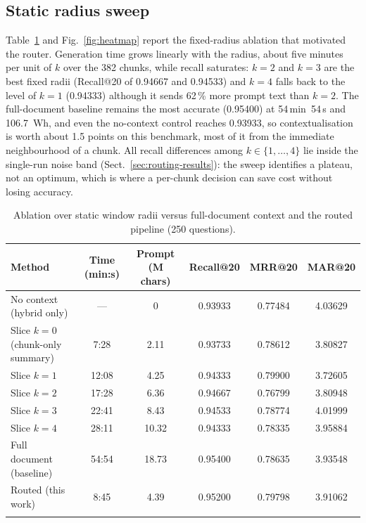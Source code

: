 \documentclass[pdflatex,sn-mathphys-num]{sn-jnl}
\makeatletter
\newcommand{\Rec}[1]{Recall@#1}
\newcommand{\MRR}[1]{MRR@#1}
\newcommand{\MAR}[1]{MAR@#1}
\theoremstyle{thmstyleone}%
\theoremstyle{thmstylethree}%
\makeatother
\begin{document}
\subsection{Static radius sweep}\label{sec:static}

Table~\ref{tab:sweep} and Fig.~\ref{fig:heatmap} report the fixed-radius ablation that motivated the router. Generation time grows linearly with the radius, about five minutes per unit of $k$ over the 382 chunks, while recall saturates: $k=2$ and $k=3$ are the best fixed radii (\Rec{20} of 0.94667 and 0.94533) and $k=4$ falls back to the level of $k=1$ (0.94333) although it sends 62\,\% more prompt text than $k=2$. The full-document baseline remains the most accurate (0.95400) at 54\,min~54\,s and 106.7\, Wh, and even the no-context control reaches 0.93933, so contextualisation is worth about 1.5 points on this benchmark, most of it from the immediate neighbourhood of a chunk. All recall differences among $k\in\{1,\dots,4\}$ lie inside the single-run noise band (Sect.~\ref{sec:routing-results}): the sweep identifies a plateau, not an optimum, which is where a per-chunk decision can save cost without losing accuracy.

\begin{table}[htbp]
\caption{Ablation over static window radii versus full-document context and the routed pipeline (250 questions).}\label{tab:sweep}
\setlength{\tabcolsep}{4pt}
\begin{tabular}{@{}p{3.7cm}ccccc@{}}
\toprule
Method & Time (min:s) & Prompt (M chars) & \Rec{20} & \MRR{20} & \MAR{20} \\
\midrule
No context (hybrid only) & --- & 0 & 0.93933 & 0.77484 & 4.03629 \\
Slice $k=0$ (chunk-only summary) & 7:28\footnotemark[1] & 2.11 & 0.93733 & 0.78612 & 3.80827 \\
Slice $k=1$ & 12:08\footnotemark[1] & 4.25 & 0.94333 & 0.79900 & 3.72605 \\
Slice $k=2$ & 17:28\footnotemark[1] & 6.36 & 0.94667 & 0.76799 & 3.80948 \\
Slice $k=3$ & 22:41\footnotemark[1] & 8.43 & 0.94533 & 0.78774 & 4.01999 \\
Slice $k=4$ & 28:11\footnotemark[1] & 10.32 & 0.94333 & 0.78335\footnotemark[2] & 3.95884 \\
Full document (baseline) & 54:54 & 18.73 & 0.95400 & 0.78635 & 3.93548 \\
Routed (this work) & 8:45 & 4.39 & 0.95200 & 0.79798 & 3.91062 \\
\botrule
\end{tabular}
\end{table}
\end{document}
